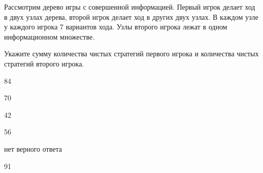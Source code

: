 
\begin{question}
Рассмотрим дерево игры с совершенной информацией. Первый игрок делает
ход в двух узлах дерева, второй игрок делает ход в других двух узлах. В
каждом узле у каждого игрока 7 вариантов хода. Узлы второго игрока лежат
в одном информационном множестве.

Укажите сумму количества чистых стратегий первого игрока и количества
чистых стратегий второго игрока.
\begin{answerlist}
  \item 84
  \item 70
  \item 42
  \item 56
  \item нет верного ответа
  \item 91
\end{answerlist}
\end{question}


